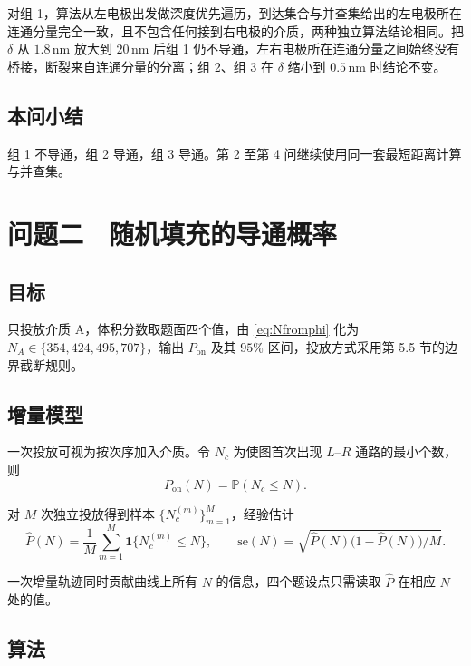 \documentclass[UTF8,a4paper,zihao=-4,fontset=none]{ctexart}
\begin{document}
对组 1，算法从左电极出发做深度优先遍历，到达集合与并查集给出的左电极所在连通分量完全一致，且不包含任何接到右电极的介质，两种独立算法结论相同。把 $\delta$ 从 $1.8\,\mathrm{nm}$ 放大到 $20\,\mathrm{nm}$ 后组 1 仍不导通，左右电极所在连通分量之间始终没有桥接，断裂来自连通分量的分离；组 2、组 3 在 $\delta$ 缩小到 $0.5\,\mathrm{nm}$ 时结论不变。

\subsection{本问小结}

组 1 不导通，组 2 导通，组 3 导通。第 2 至第 4 问继续使用同一套最短距离计算与并查集。

\section{问题二　随机填充的导通概率}

\subsection{目标}

只投放介质 A，体积分数取题面四个值，由 \eqref{eq:Nfromphi} 化为 $N_A\in\{354,424,495,707\}$，输出 $P_{\mathrm{on}}$ 及其 $95\%$ 区间，投放方式采用第 5.5 节的边界截断规则。

\subsection{增量模型}

一次投放可视为按次序加入介质。令 $N_c$ 为使图首次出现 $L$--$R$ 通路的最小个数，则
\begin{equation}
P_{\mathrm{on}}(N)=\mathbb{P}(N_c\le N).
\label{eq:surv}
\end{equation}

对 $M$ 次独立投放得到样本 $\{N_c^{(m)}\}_{m=1}^{M}$，经验估计
\begin{equation}
\hat P(N)=\frac{1}{M}\sum_{m=1}^{M}\mathbf{1}\{N_c^{(m)}\le N\},
\qquad
\mathrm{se}(N)=\sqrt{\hat P(N)\bigl(1-\hat P(N)\bigr)/M}.
\label{eq:hatP}
\end{equation}

一次增量轨迹同时贡献曲线上所有 $N$ 的信息，四个题设点只需读取 $\hat P$ 在相应 $N$ 处的值。

\subsection{算法}
\end{document}
